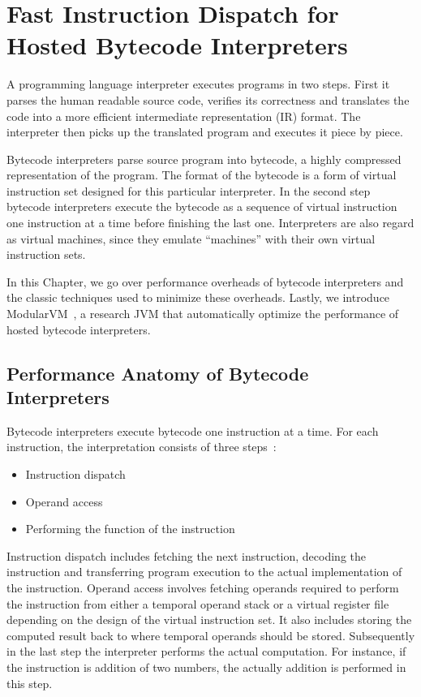 \chapter{Fast Instruction Dispatch for Hosted Bytecode Interpreters}
\label{chp:ch3-bytecode}

A programming language interpreter executes programs in two steps.
First it parses the human readable source code, verifies its correctness and translates the code into a more efficient intermediate representation (IR) format.
The interpreter then picks up the translated program and executes it piece by piece.

Bytecode interpreters parse source program into bytecode, a highly compressed representation of the program.
The format of the bytecode is a form of virtual instruction set designed for this particular interpreter.
In the second step bytecode interpreters execute the bytecode as a sequence of virtual instruction one instruction at a time before finishing the last one.
Interpreters are also regard as virtual machines, since they emulate ``machines'' with their own virtual instruction sets.

In this Chapter, we go over performance overheads of bytecode interpreters and the classic techniques used to minimize these overheads.
Lastly, we introduce ModularVM~\cite{savrun2013, savrun2014}, a research JVM that automatically optimize the performance of hosted bytecode interpreters.

\section{Performance Anatomy of Bytecode Interpreters}

Bytecode interpreters execute bytecode one instruction at a time.
For each instruction, the interpretation consists of three steps~\cite{davis2003case}:
\begin{itemize}
  \item Instruction dispatch
  \item Operand access
  \item Performing the function of the instruction
\end{itemize}
Instruction dispatch includes fetching the next instruction, decoding the instruction and transferring program execution to the actual implementation of the instruction.
Operand access involves fetching operands required to perform the instruction from either a temporal operand stack or a virtual register file depending on the design of the virtual instruction set.
It also includes storing the computed result back to where temporal operands should be stored.
Subsequently in the last step the interpreter performs the actual computation.
For instance, if the instruction is addition of two numbers, the actually addition is performed in this step.

